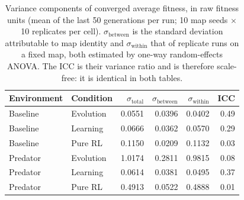 \begin{table}[t]
  \centering
  \caption{Variance components of converged average fitness, in raw fitness units (mean of the last 50 generations per run; 10 map seeds $\times$ 10 replicates per cell). $\sigma_{\text{between}}$ is the standard deviation attributable to map identity and $\sigma_{\text{within}}$ that of replicate runs on a fixed map, both estimated by one-way random-effects ANOVA. The ICC is their variance ratio and is therefore scale-free: it is identical in both tables.}
  \label{tab:icc}
  \small
  \setlength{\tabcolsep}{6pt}
  \begin{tabular}{@{}llrrrr@{}}
    \toprule
    Environment & Condition & $\sigma_{\text{total}}$ & $\sigma_{\text{between}}$ & $\sigma_{\text{within}}$ & ICC \\
    \midrule
    Baseline  & Evolution & 0.0551 & 0.0396 & 0.0402 & 0.49 \\
    Baseline  & Learning  & 0.0666 & 0.0362 & 0.0570 & 0.29 \\
    Baseline  & Pure RL   & 0.1150 & 0.0209 & 0.1132 & 0.03 \\
    \midrule
    Predator  & Evolution & 1.0174 & 0.2811 & 0.9815 & 0.08 \\
    Predator  & Learning  & 0.0614 & 0.0381 & 0.0495 & 0.37 \\
    Predator  & Pure RL   & 0.4913 & 0.0522 & 0.4888 & 0.01 \\
    \bottomrule
  \end{tabular}
\end{table}
